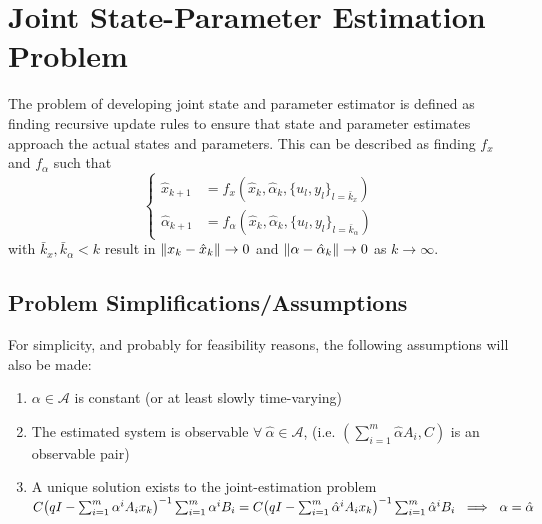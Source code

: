 \documentclass[]{article}
\begin{document}
\newpage
\section{Joint State-Parameter Estimation Problem}
The problem of developing joint state and parameter estimator is defined as finding recursive update rules to ensure that state and parameter estimates approach the actual states and parameters. This can be described as finding $f_x$ and $f_\alpha$ such that
\begin{equation}\label{eq:est_pblm_statement}
	\begin{cases}
		\hat{x}_{k+1} 		&= f_x(\hat{x}_k, \hat{\alpha}_k, \{u_l, y_l\}_{l=\bar{k}_x})\\
		\hat{\alpha}_{k+1} 	&= f_\alpha(\hat{x}_k, \hat{\alpha}_k, \{u_l, y_l\}_{l=\bar{k}_\alpha})
	\end{cases}
\end{equation}
with $\bar{k}_x, \bar{k}_\alpha < k$ result in $\norm{x_k - \hat{x}_k} \to 0$ and $\norm{\alpha - \hat{\alpha}_k} \to 0$ as $k \to \infty$.

\subsection{Problem Simplifications/Assumptions \cite{beelen2017joint}}
For simplicity, and probably for feasibility reasons, the following assumptions will also be made:

\begin{enumerate}
	\item $\alpha \in \mathcal{A}$ is constant (or at least slowly time-varying)
	\item The estimated system is observable $\forall \ \hat{\alpha} \in \mathcal{A}$, (i.e. $(\sum_{i=1}^m \hat{\alpha} A_i, C)$ is an observable pair)
	\item A unique solution exists to the joint-estimation problem\\
		$C \qty(q I - \sum_{i=1}^{m} \alpha^i A_i x_k)^{-1} \sum_{i=1}^m \alpha^i B_i = C \qty(q I - \sum_{i=1}^{m} \hat{\alpha}^i A_i x_k)^{-1} \sum_{i=1}^m \hat{\alpha}^i B_i \ \implies \ \alpha = \hat{\alpha}$
\end{enumerate}
\end{document}
